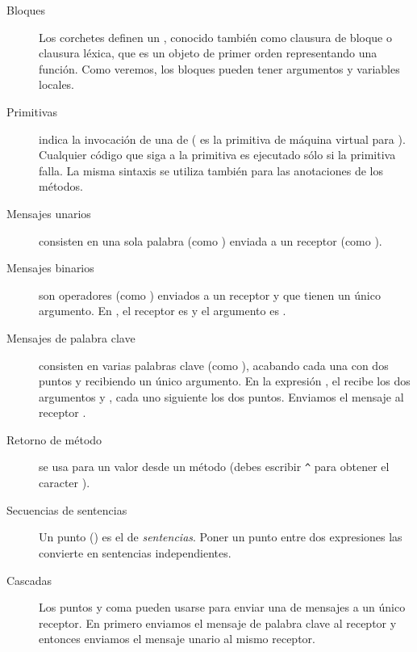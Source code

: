 \documentclass[a4paper,10pt,twoside]{book}
\begin{document}
\begin{description}
\item[Bloques] Los corchetes \ct{[ ]} definen un , conocido tambi\'en como clausura de bloque o clausura l\'exica, que es un objeto de primer orden representando una funci\'on. Como veremos, los bloques pueden tener argumentos y variables locales.

\item[Primitivas]  indica la invocaci\'on de una  de 
	( es la primitiva de m\'aquina virtual para ).
	Cualquier c\'odigo que siga a la primitiva es ejecutado s\'olo si la primitiva falla.
	La misma sintaxis se utiliza tambi\'en para las anotaciones de los m\'etodos.

\item[Mensajes unarios] consisten en una sola palabra (como ) enviada a un receptor (como ).

\item[Mensajes binarios] son operadores (como \ct{+}) enviados a un receptor y que tienen un \'unico argumento. En , el receptor es  y el argumento es .

\item[Mensajes de palabra clave] consisten en varias palabras clave (como ), acabando cada una con dos puntos y recibiendo un \'unico argumento.
En la expresi\'on , el   recibe los dos argumentos  y , cada uno siguiente los dos puntos. Enviamos el mensaje al receptor .

\item[Retorno de m\'etodo] \ct{^} se usa para  un valor desde un m\'etodo (debes escribir \verb|^| para obtener el caracter \ct{^}).

\item[Secuencias de sentencias]	Un punto () es el  de \emph{sentencias}. Poner un punto entre dos expresiones las convierte en sentencias independientes.

\item[Cascadas] Los puntos y coma pueden usarse para enviar una  de mensajes a un \'unico receptor.  En  primero enviamos el mensaje de palabra clave  al receptor  y entonces enviamos el mensaje unario  al mismo receptor.

\end{description}
\end{document}
